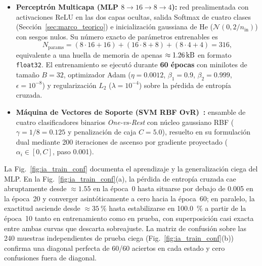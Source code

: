 \begin{itemize}\setlength{\itemsep}{2pt}\setlength{\topsep}{2pt}
    \item \textbf{Perceptrón Multicapa (MLP $8\to 16\to 8\to 4$):} red prealimentada con activaciones ReLU en las dos capas ocultas, salida Softmax de cuatro clases (Sección~\ref{sec:marco_teorico}) e inicialización gaussiana de He ($\mathcal{N}(0, 2/n_{\text{in}})$) con sesgos nulos. Su número exacto de parámetros entrenables es
    \begin{equation}
        N_{\text{params}} = (8\cdot 16 + 16) + (16\cdot 8 + 8) + (8\cdot 4 + 4) = 316,
        \label{eq:mlp_params_count}
    \end{equation}
    equivalente a una huella de memoria de apenas $\approx\qty{1.26}{\kilo\byte}$ en formato \texttt{float32}. El entrenamiento se ejecutó durante \textbf{60 épocas} con minilotes de tamaño $B=32$, optimizador Adam ($\eta=\num{0.0012}$, $\beta_1=\num{0.9}$, $\beta_2=\num{0.999}$, $\epsilon=10^{-8}$) y regularización $L_2$ ($\lambda=10^{-4}$) sobre la pérdida de entropía cruzada.
    \item \textbf{Máquina de Vectores de Soporte (SVM RBF OvR)~\cite{Gangsar2020}:} ensamble de cuatro clasificadores binarios \emph{One-vs-Rest} con núcleo gaussiano RBF ($\gamma = 1/8 = \num{0.125}$ y penalización de caja $C=\num{5.0}$), resuelto en su formulación dual mediante \num{200} iteraciones de ascenso por gradiente proyectado ($\alpha_i\in[0, C]$, paso \num{0.001}).
\end{itemize}

La Fig.~\ref{fig:ia_train_conf} documenta el aprendizaje y la generalización ciega del MLP. En la Fig.~\ref{fig:ia_train_conf}(a), la pérdida de entropía cruzada cae abruptamente desde $\approx\num{1.55}$ en la época~0 hasta situarse por debajo de \num{0.005} en la época~20 y converger asintóticamente a cero hacia la época~60; en paralelo, la exactitud asciende desde $\approx\qty{35}{\percent}$ hasta estabilizarse en \qty{100.0}{\percent} a partir de la época~10 tanto en entrenamiento como en prueba, con superposición casi exacta entre ambas curvas que descarta sobreajuste. La matriz de confusión sobre las \num{240} muestras independientes de prueba ciega (Fig.~\ref{fig:ia_train_conf}(b)) confirma una diagonal perfecta de 60/60 aciertos en cada estado y cero confusiones fuera de diagonal.

